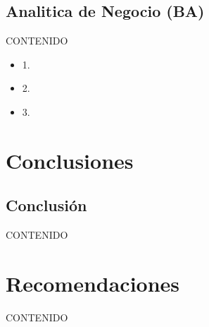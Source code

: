 \documentclass[preprint,12pt]{elsarticle}
\begin{document}
	\subsection{Analitica de Negocio (BA) }
	CONTENIDO
	\begin{itemize}
	\item 1. 
	\item 2. 
	\item 3. 
	\end{itemize}



	





\section{Conclusiones}
\subsection{Conclusión }	
CONTENIDO





\section{Recomendaciones}	
CONTENIDO






	
	\newpage
	
		
\end{document}
